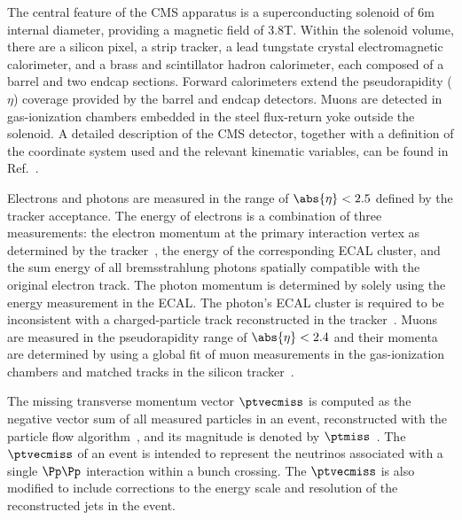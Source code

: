 The central feature of the CMS apparatus is a superconducting solenoid of 6\unit{m} internal diameter, providing a magnetic field of 3.8\unit{T}. Within the solenoid volume, there are a silicon pixel, a strip tracker, a lead tungstate crystal electromagnetic calorimeter, and a brass and scintillator hadron calorimeter, each composed of a barrel and two endcap sections. Forward calorimeters extend the pseudorapidity ($\eta$) coverage provided by the barrel and endcap detectors. Muons are detected in gas-ionization chambers embedded in the steel flux-return yoke outside the solenoid. A detailed description of the CMS detector, together with a definition of the coordinate system used and the relevant kinematic variables, can be found in Ref.~\cite{Chatrchyan:2008zzk}.

Electrons and photons are measured in the range of $\abs{\eta} < 2.5$ defined by the tracker acceptance. The energy of electrons is a combination of three measurements: the electron momentum at the primary interaction vertex as determined by the tracker~\cite{pvdefinition}, the energy of the corresponding ECAL cluster, and the sum energy of all bremsstrahlung photons spatially compatible with the original electron track. The photon momentum is determined by solely using the energy measurement in the ECAL. The photon's ECAL cluster is required to be inconsistent with a charged-particle track reconstructed in the tracker~\cite{cmscollaboration2020electron}. Muons are measured in the pseudorapidity range of $\abs{\eta} < 2.4$ and their momenta are determined by using a global fit of muon measurements in the gas-ionization chambers and matched tracks in the silicon tracker~\cite{Sirunyan:2018}.

The missing transverse momentum vector $\ptvecmiss$ is computed as the negative vector \pt sum of all measured particles in an event, reconstructed with the particle flow algorithm~\cite{CMS-PRF-14-001}, and its magnitude is denoted by $\ptmiss$~\cite{Sirunyan_2019}. The $\ptvecmiss$ of an event is intended to represent the neutrinos associated with a single $\Pp \Pp$ interaction within a bunch crossing. The $\ptvecmiss$ is also modified to include corrections to the energy scale and resolution of the reconstructed jets in the event.

